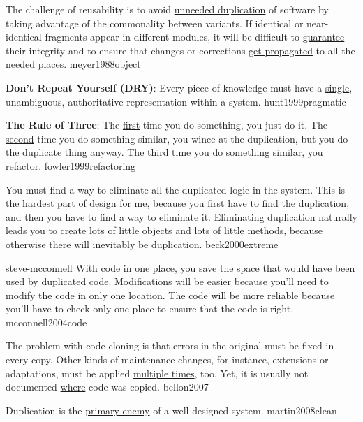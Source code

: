 \documentclass{article}
\begin{document}
  {The challenge of reusability is to avoid \ul{unneeded duplication} of software by taking advantage of the commonality between variants. If identical or near-identical fragments appear in different modules, it will be difficult to \ul{guarantee} their integrity and to ensure that changes or corrections \ul{get propagated} to all the needed places.}
  {meyer1988object}

  {\textbf{Don't Repeat Yourself (DRY)}: Every piece of knowledge must have a \ul{single}, unambiguous, authoritative representation within a system.}
  {hunt1999pragmatic}

  {\textbf{The Rule of Three}: The \ul{first} time you do something, you just do it. The \ul{second} time you do something similar, you wince at the duplication, but you do the duplicate thing anyway. The \ul{third} time you do something similar, you refactor.}
  {fowler1999refactoring}

  {You must find a way to eliminate all the duplicated logic in the system. This is the hardest part of design for me, because you first have to find the duplication, and then you have to find a way to eliminate it. Eliminating duplication naturally leads you to create \ul{lots of little objects} and lots of little methods, because otherwise there will inevitably be duplication.}
  {beck2000extreme}

\lnQuote
  {steve-mcconnell}
  {With code in one place, you save the space that would have been used by duplicated code. Modifications will be easier because you'll need to modify the code in \ul{only one location}. The code will be more reliable because you'll have to check only one place to ensure that the code is right.}
  {mcconnell2004code}

  {The problem with code cloning is that errors in the original must be fixed in every copy. Other kinds of maintenance changes, for instance, extensions or adaptations, must be applied \ul{multiple times}, too. Yet, it is usually not documented \ul{where} code was copied.}
  {bellon2007}

  {Duplication is the \ul{primary enemy} of a well-designed system.}
  {martin2008clean}

\end{document}
